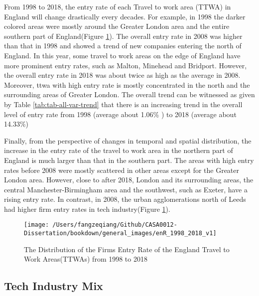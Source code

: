 \documentclass[
  12pt,
  oneside]{book}
\begin{document}
From 1998 to 2018, the entry rate of each Travel to work area (TTWA) in England will change drastically every decades. For example, in 1998 the darker colored areas were mostly around the Greater London area and the entire southern part of England(Figure \ref{fig:fig-enR-1998-2018-v1}). The overall entry rate in 2008 was higher than that in 1998 and showed a trend of new companies entering the north of England. In this year, some travel to work areas on the edge of England have more prominent entry rates, such as Malton, Minehead and Bridport. However, the overall entry rate in 2018 was about twice as high as the average in 2008. Moreover, ttwa with high entry rate is mostly concentrated in the north and the surrounding areas of Greater London. The overall trend can be witnessed as given by Table \ref{tab:tab-all-var-trend} that there is an increasing trend in the overall level of entry rate from 1998 (average about 1.06\% ) to 2018
(average about 14.33\%)

Finally, from the perspective of changes in temporal and spatial distribution, the increase in the entry rate of the travel to work area in the northern part of England is much larger than that in the southern part. The areas with high entry rates before 2008 were mostly scattered in other areas except for the Greater London area. However, close to after 2018, London and its surrounding areas, the central Manchester-Birmingham area and the southwest, such as Exeter, have a rising entry rate. In contrast, in 2008, the urban agglomerations north of Leeds had higher firm entry rates in tech industry(Figure \ref{fig:fig-enR-1998-2018-v1}).

\begin{figure}
\texttt{[image: /Users/fangzeqiang/Github/CASA0012-Dissertation/bookdown/general\_images/enR\_1998\_2018\_v1]} \caption{The Distribution of the Firms Entry Rate of the England Travel to Work Areas(TTWAs) from 1998 to 2018}\label{fig:fig-enR-1998-2018-v1}
\end{figure}

\hypertarget{tech-industry-mix}{%
\subsection{Tech Industry Mix}\label{tech-industry-mix}}
\end{document}
